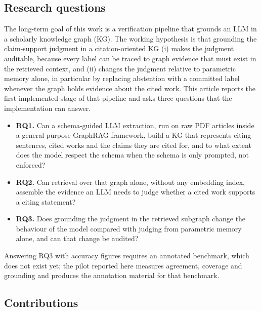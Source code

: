 \documentclass[lettersize,journal]{IEEEtran}
\begin{document}
\subsection{Research questions}
\label{sec:intro_rq}

The long-term goal of this work is a verification pipeline that grounds an LLM in a scholarly knowledge graph (KG). The working hypothesis is that grounding the claim-support judgment in a citation-oriented KG (i) makes the judgment auditable, because every label can be traced to graph evidence that must exist in the retrieved context, and (ii) changes the judgment relative to parametric memory alone, in particular by replacing abstention with a committed label whenever the graph holds evidence about the cited work. This article reports the first implemented stage of that pipeline and asks three questions that the implementation can answer.

\begin{itemize}
\item \textbf{RQ1.} Can a schema-guided LLM extraction, run on raw PDF articles inside a general-purpose GraphRAG framework, build a KG that represents citing sentences, cited works and the claims they are cited for, and to what extent does the model respect the schema when the schema is only prompted, not enforced?
\item \textbf{RQ2.} Can retrieval over that graph alone, without any embedding index, assemble the evidence an LLM needs to judge whether a cited work supports a citing statement?
\item \textbf{RQ3.} Does grounding the judgment in the retrieved subgraph change the behaviour of the model compared with judging from parametric memory alone, and can that change be audited?
\end{itemize}

Answering RQ3 with accuracy figures requires an annotated benchmark, which does not exist yet; the pilot reported here measures agreement, coverage and grounding and produces the annotation material for that benchmark.

\subsection{Contributions}
\end{document}

